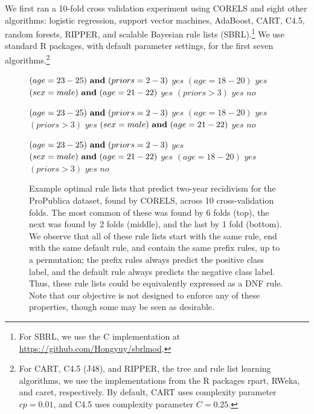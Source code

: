 We first ran a 10-fold cross validation experiment using CORELS
and eight other algorithms:
logistic regression, support vector machines, AdaBoost, CART, C4.5,
random forests, RIPPER, and scalable Bayesian rule lists (SBRL).\footnote{For
SBRL, we use the C implementation at \url{https://github.com/Hongyuy/sbrlmod}.}
%
We use standard R packages, with default parameter settings,
for the first seven algorithms.\footnote{For CART, C4.5 (J48), and RIPPER,
\ie the tree and rule list learning algorithms, we use the implementations
from the R packages rpart, RWeka, and caret, respectively.
%
By default, CART uses complexity parameter ${cp = 0.01}$,
and C4.5 uses complexity parameter ${C = 0.25}$.
}

\begin{figure}[t]
\begin{algorithmic}
\State \bif $(age = 23-25) {\bf ~and~} (priors = 2-3)$ \bthen $yes$
\State \belif $(age = 18-20)$ \bthen $yes$
\State \belif $(sex = male) {\bf ~and~} (age = 21-22)$ \bthen $yes$
\State \belif $(priors > 3)$ \bthen $yes$
\State \belse $no$
\end{algorithmic}
\vspace{1mm}
\begin{algorithmic}
\State \bif $(age = 23-25) {\bf ~and~} (priors = 2-3)$ \bthen $yes$
\State \belif $(age = 18-20)$ \bthen $yes$
\State \belif $(priors > 3)$ \bthen $yes$
\State \belif $(sex = male) {\bf ~and~} (age = 21-22)$ \bthen $yes$
\State \belse $no$
\end{algorithmic}
\vspace{1mm}
\begin{algorithmic}
\State \bif $(age = 23-25) {\bf ~and~} (priors = 2-3)$ \bthen $yes$
\State \belif $(sex = male) {\bf ~and~} (age = 21-22)$ \bthen $yes$
\State \belif $(age = 18-20)$ \bthen $yes$
\State \belif $(priors > 3)$ \bthen $yes$
\State \belse $no$
\end{algorithmic}
\caption{Example optimal rule lists that predict two-year recidivism for the
ProPublica dataset, found by CORELS, across 10 cross-validation folds.
%
The most common of these was found by 6 folds (top),
the next was found by 2 folds (middle), and the last by 1 fold (bottom).
%
We observe that all of these rule lists start with the same rule,
end with the same default rule, and contain the same prefix rules, up to a permutation;
the prefix rules always predict the positive class label,
and the default rule always predicts the negative class label.
%
Thus, these rule lists could be equivalently expressed as a DNF rule.
%
Note that our objective is not designed to enforce any of these properties,
though some may be seen as desirable.
}
\label{fig:recidivism-all-folds}
\end{figure}


